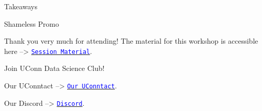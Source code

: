 \documentclass{beamer}
\begin{document}
\begin{frame}{Takeaways}

\end{frame}

\begin{frame}{Shameless Promo}

Thank you very much for attending! The material for this workshop is accessible here --> \href{https://github.com/PranavTavildar1/Tensorflow-For-Sports-Analytics}{\tt \textcolor{blue}{Session Material}}.
\par
Join UConn Data Science Club! 
\par
Our UConntact --> \href{https://uconntact.uconn.edu/organization/datascience}{\tt \textcolor{blue}{Our UConntact}}.
\par
Our Discord --> \href{https://discord.gg/UJCZjXUWzg}{\tt \textcolor{blue}{Discord}}.

\end{frame}
\end{document}
